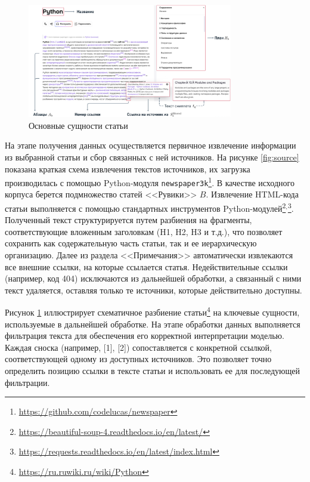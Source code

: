 \documentclass{article}
\begin{document}
\begin{figure}[ht!]
  \centering
  \includegraphics[width=0.8\textwidth]{figures/article_entities.png}
  \caption{Основные сущности статьи}
  \label{fig:article}
\end{figure}

На этапе получения данных осуществляется первичное извлечение информации из выбранной статьи и сбор связанных с ней источников. На рисунке \ref{fig:source} показана краткая схема извлечения текстов источников, 
их загрузка производилась с помощью Python-модуля \texttt{newspaper3k}\footnote{\url{https://github.com/codelucas/newspaper}}.
В качестве исходного корпуса берется подмножество статей <<Рувики>> \(B\).
Извлечение HTML-кода статьи выполняется с помощью стандартных инструментов Python-модулей\footnote{\url{https://beautiful-soup-4.readthedocs.io/en/latest/}}$^,$\footnote{\url{https://requests.readthedocs.io/en/latest/index.html}}. 
Полученный текст структурируется путем разбиения на фрагменты, соответствующие вложенным заголовкам (H1, H2, H3 и т.д.), что позволяет сохранить как содержательную часть статьи, так и ее иерархическую организацию. 
Далее из раздела <<Примечания>> автоматически извлекаются все внешние ссылки, на которые ссылается статья. Недействительные ссылки (например, код 404) исключаются из дальнейшей обработки,
а связанный с ними текст удаляется, оставляя только те источники, которые действительно доступны.

Рисунок \ref{fig:article} иллюстрирует схематичное разбиение статьи\footnote{\url{https://ru.ruwiki.ru/wiki/Python}} на ключевые сущности, используемые в дальнейшей обработке.
На этапе обработки данных выполняется фильтрация текста для обеспечения его корректной интерпретации моделью. 
Каждая сноска (например, [1], [2]) сопоставляется с конкретной ссылкой, соответствующей одному из доступных источников. 
Это позволяет точно определить позицию ссылки в тексте статьи и использовать ее для последующей фильтрации. 
\end{document}
